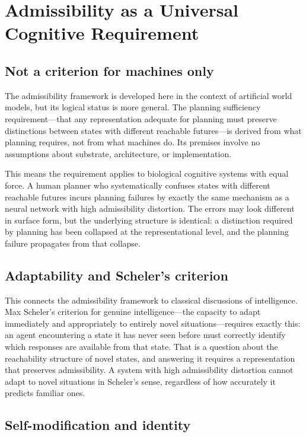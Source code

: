 \documentclass[11pt,a4paper]{article}
\begin{document}
\section{Admissibility as a Universal Cognitive Requirement}

\subsection{Not a criterion for machines only}

The admissibility framework is developed here in the context of artificial
world models, but its logical status is more general. The planning sufficiency
requirement---that any representation adequate for planning must preserve
distinctions between states with different reachable futures---is derived from
what planning requires, not from what machines do. Its premises involve no
assumptions about substrate, architecture, or implementation.

This means the requirement applies to biological cognitive systems with equal
force. A human planner who systematically confuses states with different
reachable futures incurs planning failures by exactly the same mechanism as a
neural network with high admissibility distortion. The errors may look different
in surface form, but the underlying structure is identical: a distinction required
by planning has been collapsed at the representational level, and the planning
failure propagates from that collapse.

\subsection{Adaptability and Scheler's criterion}

This connects the admissibility framework to classical discussions of intelligence.
Max Scheler's criterion for genuine intelligence---the capacity to adapt
immediately and appropriately to entirely novel situations---requires exactly
this: an agent encountering a state it has never seen before must correctly
identify which responses are available from that state. That is a question
about the reachability structure of novel states, and answering it requires
a representation that preserves admissibility. A system with high admissibility
distortion cannot adapt to novel situations in Scheler's sense, regardless of
how accurately it predicts familiar ones.

\subsection{Self-modification and identity}
\end{document}
